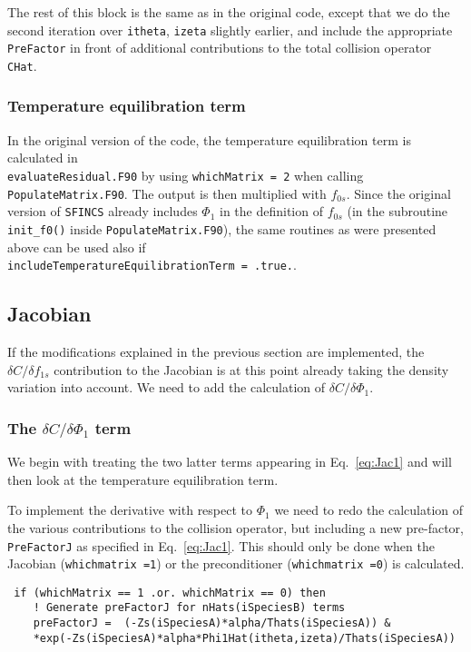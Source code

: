\documentclass[12pt]{article}
\begin{document}
The rest of this block is the same as in the original code, except that we do the second iteration over \texttt{itheta}, \texttt{izeta} slightly earlier, and include the appropriate \texttt{PreFactor} in front of additional contributions to the total collision operator \texttt{CHat}.

\subsubsection*{Temperature equilibration term}
In the original version of the code, the temperature equilibration term is calculated in \\ \texttt{evaluateResidual.F90} by using \texttt{whichMatrix = 2} when calling \texttt{PopulateMatrix.F90}. The output is then multiplied with $f_{0s}$. Since the original version of \texttt{SFINCS} already includes $\Phi_1$ in the definition of $f_{0s}$ (in the subroutine \texttt{init\_f0()} inside \texttt{PopulateMatrix.F90}), the same routines as were presented above can be used also if\\ \texttt{includeTemperatureEquilibrationTerm = .true.}. 

\subsection*{Jacobian}
 If the modifications explained in the previous section are implemented, the $\delta C/\delta f_{1s}$ contribution to the Jacobian is at this point already taking the density variation into account. We need to add the calculation of $\delta C/\delta \Phi_1$.

\subsubsection*{The $\delta C/\delta \Phi_1$ term}
\label{sec:Jac1}
We begin with treating the two latter terms appearing in Eq.~\eqref{eq:Jac1} and will then look at the temperature equilibration term. 

To implement the derivative with respect to $\Phi_1$ we need to redo the calculation of the various contributions to the collision operator, but including a new pre-factor, \texttt{PreFactorJ} as specified in Eq.~\eqref{eq:Jac1}. This should only be done when the Jacobian (\texttt{whichmatrix =1}) or the preconditioner (\texttt{whichmatrix =0}) is calculated.

\begin{lstlisting}
 if (whichMatrix == 1 .or. whichMatrix == 0) then
    ! Generate preFactorJ for nHats(iSpeciesB) terms              
    preFactorJ =  (-Zs(iSpeciesA)*alpha/Thats(iSpeciesA)) &
    *exp(-Zs(iSpeciesA)*alpha*Phi1Hat(itheta,izeta)/Thats(iSpeciesA))
\end{lstlisting}
\end{document}
